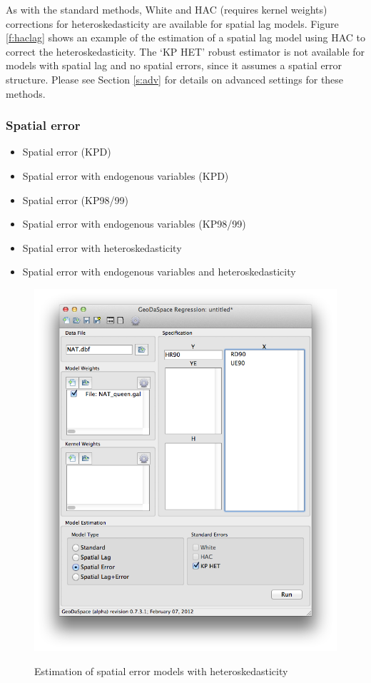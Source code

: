 \documentclass{article}
\begin{document}
As with the standard methods, White and HAC (requires kernel weights) corrections for heteroskedasticity are available for spatial lag models. Figure \ref{f:haclag} shows an example of the estimation of a spatial lag model using HAC to correct the heteroskedasticity. The `KP HET' robust estimator is not available for models with spatial lag and no spatial errors, since it assumes a spatial error structure. Please see Section \ref{s:adv} for details on advanced settings for these methods.
\FloatBarrier

\subsubsection*{Spatial error}
\begin{itemize}
\item Spatial error (KPD)
\item Spatial error with endogenous variables (KPD)
\item Spatial error (KP98/99)
\item Spatial error with endogenous variables (KP98/99)
\item Spatial error with heteroskedasticity
\item Spatial error with endogenous variables and heteroskedasticity
\end{itemize}

\begin{figure}[htb]
\begin{center}
\includegraphics[width=0.7\linewidth]{GS_het.png}\\
\caption{Estimation of spatial error models with heteroskedasticity}
\label{f:GS_het}
\end{center}
\end{figure}
\end{document}
